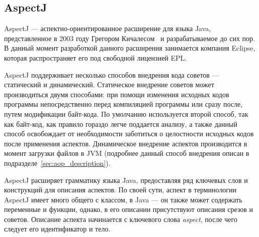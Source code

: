 \subsection{AspectJ}
\label{sub:aspectj_overwiev}

AspectJ --- аспектно-ориентированное расширение для языка Java, представленное в
2003 году Грегором Кичалесом~\cite{kiczales_aspectj} и разрабатываемое до сих
пор.
В данный момент разработкой данного расширения занимается компания Eclipse,
которая распространяет его под свободной лицензией EPL.

AspectJ поддерживает несколько способов внедрения кода советов --- статический и
динамический.
Статическое внедрение советов может производиться двумя способами: при помощи
изменения исходных кодов программы непосредственно перед компиляцией программы
или сразу после, путем модификации байт-кода.
По умолчанию используется второй способ, так как байт-код, как правило гораздо
легче поддается анализу, а также данный способ освобождает от необходимости
заботиться о целостности исходных кодов после применения аспектов.
Динамическое внедрение аспектов производится в момент загрузки файлов в JVM
(подробнее данный способ внедрения описан в подразделе~\ref{sec:aop_description}).

AspectJ расширяет грамматику языка Java, предоставляя ряд ключевых слов и
конструкций для описания аспектов.
По своей сути, аспект в терминологии AspectJ имеет много общего с классом, в
Java --- он также может содержать переменные и функции, однако, в его описании
присутствуют описания срезов и советов.
Описание аспекта начинается с ключевого слова \textit{aspect}, после чего
следует его идентификатор и тело.

